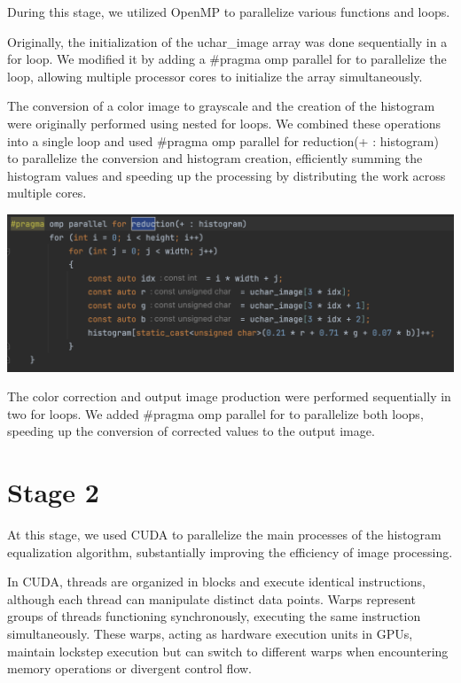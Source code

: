 \documentclass[sigconf]{acmart}
\begin{document}
During this stage, we utilized OpenMP to parallelize various functions and loops.

Originally, the initialization of the uchar\_image array was done sequentially in a for loop. We modified it by adding a \#pragma omp parallel for to parallelize the loop, allowing multiple processor cores to initialize the array simultaneously.


The conversion of a color image to grayscale and the creation of the histogram were originally performed using nested for loops. We combined these operations into a single loop and used \#pragma omp parallel for reduction(+ : histogram) to parallelize the conversion and histogram creation, efficiently summing the histogram values and speeding up the processing by distributing the work across multiple cores.

\begin{center}
\centering
\includegraphics[width=0.8\linewidth]{vizs/histogram_openmp.png}
\label{histogram_loop}
\end{center}

The color correction and output image production were performed sequentially in two for loops. We added \#pragma omp parallel for to parallelize both loops, speeding up the conversion of corrected values to the output image.
\section{Stage 2}
At this stage, we used CUDA to parallelize the main processes of the histogram equalization algorithm, substantially improving the efficiency of image processing.

In CUDA, threads are organized in blocks and execute identical instructions, although each thread can manipulate distinct data points. Warps represent groups of threads functioning synchronously, executing the same instruction simultaneously. These warps, acting as hardware execution units in GPUs, maintain lockstep execution but can switch to different warps when encountering memory operations or divergent control flow.
\end{document}
